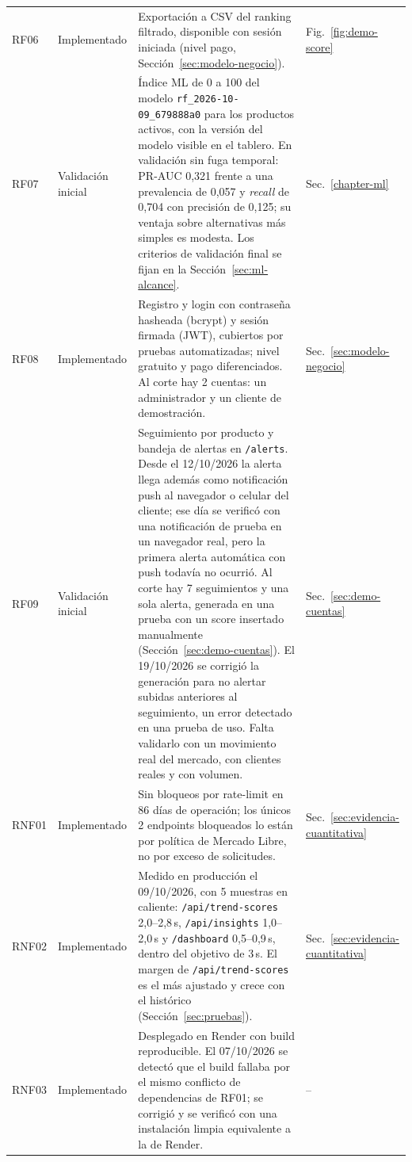 \begin{longtable}{@{}>{\raggedright\arraybackslash}p{1.2cm} >{\raggedright\arraybackslash}p{2.3cm} >{\raggedright\arraybackslash}p{8.7cm} >{\raggedright\arraybackslash}p{1.9cm}@{}}
	RF06 & Implementado & Exportación a CSV del ranking filtrado, disponible con sesión iniciada (nivel pago, Sección~\ref{sec:modelo-negocio}). & Fig.~\ref{fig:demo-score} \\
	RF07 & Validación inicial & Índice ML de 0 a 100 del modelo \texttt{rf\_2026-10-09\_679888a0} para los productos activos, con la versión del modelo visible en el tablero. En validación sin fuga temporal: PR-AUC 0,321 frente a una prevalencia de 0,057 y \emph{recall} de 0,704 con precisión de 0,125; su ventaja sobre alternativas más simples es modesta. Los criterios de validación final se fijan en la Sección~\ref{sec:ml-alcance}. & Sec.~\ref{chapter-ml} \\
	RF08 & Implementado & Registro y login con contraseña hasheada (bcrypt) y sesión firmada (JWT), cubiertos por pruebas automatizadas; nivel gratuito y pago diferenciados. Al corte hay 2 cuentas: un administrador y un cliente de demostración. & Sec.~\ref{sec:modelo-negocio} \\
	RF09 & Validación inicial & Seguimiento por producto y bandeja de alertas en \texttt{/alerts}. Desde el 12/10/2026 la alerta llega además como notificación push al navegador o celular del cliente; ese día se verificó con una notificación de prueba en un navegador real, pero la primera alerta automática con push todavía no ocurrió. Al corte hay 7 seguimientos y una sola alerta, generada en una prueba con un score insertado manualmente (Sección~\ref{sec:demo-cuentas}). El 19/10/2026 se corrigió la generación para no alertar subidas anteriores al seguimiento, un error detectado en una prueba de uso. Falta validarlo con un movimiento real del mercado, con clientes reales y con volumen. & Sec.~\ref{sec:demo-cuentas} \\
	RNF01 & Implementado & Sin bloqueos por rate-limit en 86 días de operación; los únicos 2 endpoints bloqueados lo están por política de Mercado Libre, no por exceso de solicitudes. & Sec.~\ref{sec:evidencia-cuantitativa} \\
	RNF02 & Implementado & Medido en producción el 09/10/2026, con 5 muestras en caliente: \texttt{/api/trend-scores} 2,0--2,8\,s, \texttt{/api/insights} 1,0--2,0\,s y \texttt{/dashboard} 0,5--0,9\,s, dentro del objetivo de 3\,s. El margen de \texttt{/api/trend-scores} es el más ajustado y crece con el histórico (Sección~\ref{sec:pruebas}). & Sec.~\ref{sec:evidencia-cuantitativa} \\
	RNF03 & Implementado & Desplegado en Render con build reproducible. El 07/10/2026 se detectó que el build fallaba por el mismo conflicto de dependencias de RF01; se corrigió y se verificó con una instalación limpia equivalente a la de Render. & -- \\

\end{longtable}
